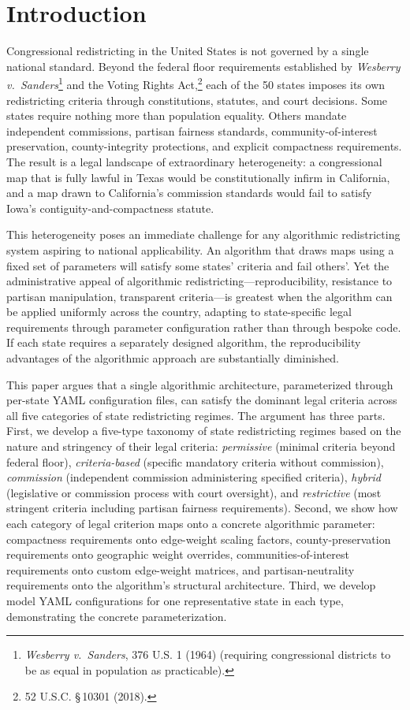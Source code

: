 \section{Introduction}
\label{sec:introduction}

Congressional redistricting in the United States is not governed by a single national standard. Beyond the federal floor requirements established by \textit{Wesberry v.\ Sanders}\footnote{\textit{Wesberry v.\ Sanders}, 376 U.S. 1 (1964) (requiring congressional districts to be as equal in population as practicable).} and the Voting Rights Act,\footnote{52 U.S.C. \S\,10301 (2018).} each of the 50 states imposes its own redistricting criteria through constitutions, statutes, and court decisions. Some states require nothing more than population equality. Others mandate independent commissions, partisan fairness standards, community-of-interest preservation, county-integrity protections, and explicit compactness requirements. The result is a legal landscape of extraordinary heterogeneity: a congressional map that is fully lawful in Texas would be constitutionally infirm in California, and a map drawn to California's commission standards would fail to satisfy Iowa's contiguity-and-compactness statute.

This heterogeneity poses an immediate challenge for any algorithmic redistricting system aspiring to national applicability. An algorithm that draws maps using a fixed set of parameters will satisfy some states' criteria and fail others'. Yet the administrative appeal of algorithmic redistricting---reproducibility, resistance to partisan manipulation, transparent criteria---is greatest when the algorithm can be applied uniformly across the country, adapting to state-specific legal requirements through parameter configuration rather than through bespoke code. If each state requires a separately designed algorithm, the reproducibility advantages of the algorithmic approach are substantially diminished.

This paper argues that a single algorithmic architecture, parameterized through per-state YAML configuration files, can satisfy the dominant legal criteria across all five categories of state redistricting regimes. The argument has three parts. First, we develop a five-type taxonomy of state redistricting regimes based on the nature and stringency of their legal criteria: \textit{permissive} (minimal criteria beyond federal floor), \textit{criteria-based} (specific mandatory criteria without commission), \textit{commission} (independent commission administering specified criteria), \textit{hybrid} (legislative or commission process with court oversight), and \textit{restrictive} (most stringent criteria including partisan fairness requirements). Second, we show how each category of legal criterion maps onto a concrete algorithmic parameter: compactness requirements onto edge-weight scaling factors, county-preservation requirements onto geographic weight overrides, communities-of-interest requirements onto custom edge-weight matrices, and partisan-neutrality requirements onto the algorithm's structural architecture. Third, we develop model YAML configurations for one representative state in each type, demonstrating the concrete parameterization.

